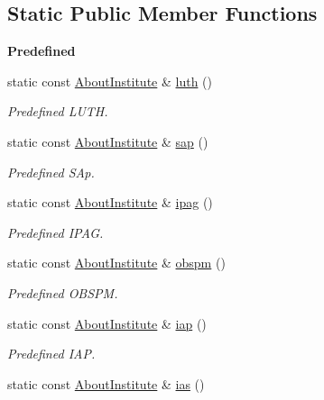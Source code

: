 \subsection*{Static Public Member Functions}
\begin{Indent}{\bf Predefined}\par
\begin{DoxyCompactItemize}
\item 
static const \hyperlink{exceptionmagrathea_1_1AboutInstitute}{About\-Institute} \& \hyperlink{exceptionmagrathea_1_1AboutInstitute_afe19e31fa70f033682398f62394a294d}{luth} ()
\begin{DoxyCompactList}\small\item\em Predefined L\-U\-T\-H. \end{DoxyCompactList}\item 
static const \hyperlink{exceptionmagrathea_1_1AboutInstitute}{About\-Institute} \& \hyperlink{exceptionmagrathea_1_1AboutInstitute_a35181be0df2209207c98239c5a208a14}{sap} ()
\begin{DoxyCompactList}\small\item\em Predefined S\-Ap. \end{DoxyCompactList}\item 
static const \hyperlink{exceptionmagrathea_1_1AboutInstitute}{About\-Institute} \& \hyperlink{exceptionmagrathea_1_1AboutInstitute_a97d2306619f0fb2459351fedb99954db}{ipag} ()
\begin{DoxyCompactList}\small\item\em Predefined I\-P\-A\-G. \end{DoxyCompactList}\item 
static const \hyperlink{exceptionmagrathea_1_1AboutInstitute}{About\-Institute} \& \hyperlink{exceptionmagrathea_1_1AboutInstitute_adb25e68b8598e30046efda7b128d346b}{obspm} ()
\begin{DoxyCompactList}\small\item\em Predefined O\-B\-S\-P\-M. \end{DoxyCompactList}\item 
static const \hyperlink{exceptionmagrathea_1_1AboutInstitute}{About\-Institute} \& \hyperlink{exceptionmagrathea_1_1AboutInstitute_a8d68ea4d4a96508021decbfaecec9920}{iap} ()
\begin{DoxyCompactList}\small\item\em Predefined I\-A\-P. \end{DoxyCompactList}\item 
static const \hyperlink{exceptionmagrathea_1_1AboutInstitute}{About\-Institute} \& \hyperlink{exceptionmagrathea_1_1AboutInstitute_a0bab98480f6694d9916f917f889e2406}{ias} ()

\end{DoxyCompactItemize}
\end{Indent}

